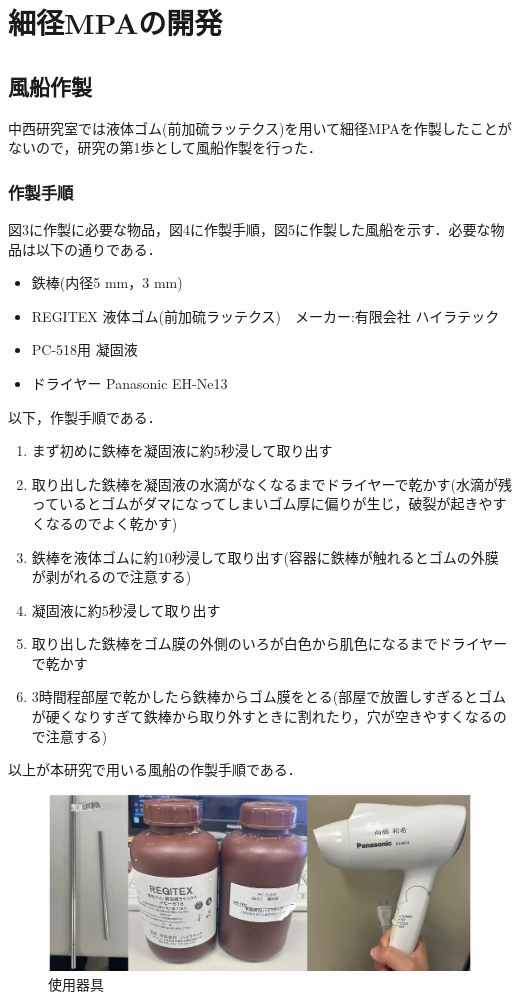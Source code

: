 \newpage
\section{細径MPAの開発}
\subsection{風船作製}
中西研究室では液体ゴム(前加硫ラッテクス)を用いて細径MPAを作製したことがないので，研究の第1歩として風船作製を行った．
\subsubsection{作製手順}
図3に作製に必要な物品，図4に作製手順，図5に作製した風船を示す．必要な物品は以下の通りである．
\begin{itemize}
    \item 鉄棒(内径5 mm，3 mm)
    \item REGITEX 液体ゴム(前加硫ラッテクス)　メーカー:有限会社 ハイラテック
    \item PC-518用 凝固液
    \item ドライヤー Panasonic EH-Ne13
  \end{itemize}
  以下，作製手順である．
\begin{enumerate}
    \item まず初めに鉄棒を凝固液に約5秒浸して取り出す
    \item 取り出した鉄棒を凝固液の水滴がなくなるまでドライヤーで乾かす(水滴が残っているとゴムがダマになってしまいゴム厚に偏りが生じ，破裂が起きやすくなるのでよく乾かす)
    \item 鉄棒を液体ゴムに約10秒浸して取り出す(容器に鉄棒が触れるとゴムの外膜が剥がれるので注意する)
    \item 凝固液に約5秒浸して取り出す
    \item 取り出した鉄棒をゴム膜の外側のいろが白色から肌色になるまでドライヤーで乾かす
    \item 3時間程部屋で乾かしたら鉄棒からゴム膜をとる(部屋で放置しすぎるとゴムが硬くなりすぎて鉄棒から取り外すときに割れたり，穴が空きやすくなるので注意する)
\end{enumerate}
以上が本研究で用いる風船の作製手順である．
\begin{figure}[!h]
  \centering  %
  \includegraphics[scale=0.3]{pic/kigu.PNG}
  \caption{使用器具}
\end{figure}
